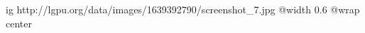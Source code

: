  
 
 
 
 

\ifcmt
  ig http://lgpu.org/data/images/1639392790/screenshot_7.jpg
  @width 0.6
	@wrap center
\fi
